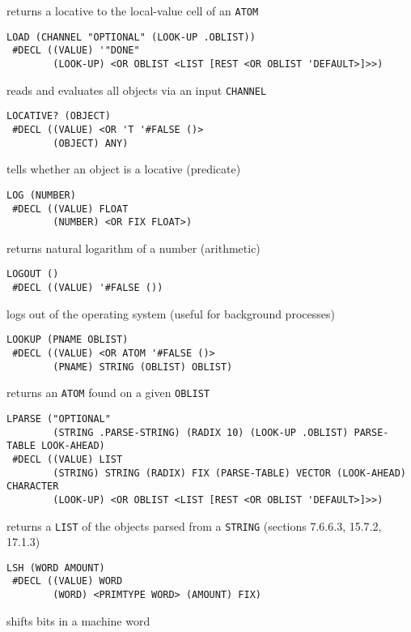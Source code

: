 \documentclass[a4paper]{scrbook}
\begin{document}
returns a locative to the local-value cell of an \texttt{ATOM}

\begin{verbatim}
LOAD (CHANNEL "OPTIONAL" (LOOK-UP .OBLIST))
 #DECL ((VALUE) '"DONE"
        (LOOK-UP) <OR OBLIST <LIST [REST <OR OBLIST 'DEFAULT>]>>)
\end{verbatim}

reads and evaluates all objects via an input \texttt{CHANNEL}

\begin{verbatim}
LOCATIVE? (OBJECT)
 #DECL ((VALUE) <OR 'T '#FALSE ()>
        (OBJECT) ANY)
\end{verbatim}

tells whether an object is a locative (predicate)

\begin{verbatim}
LOG (NUMBER)
 #DECL ((VALUE) FLOAT
        (NUMBER) <OR FIX FLOAT>)
\end{verbatim}

returns natural logarithm of a number (arithmetic)

\begin{verbatim}
LOGOUT ()
 #DECL ((VALUE) '#FALSE ())
\end{verbatim}

logs out of the operating system (useful for background processes)

\begin{verbatim}
LOOKUP (PNAME OBLIST)
 #DECL ((VALUE) <OR ATOM '#FALSE ()>
        (PNAME) STRING (OBLIST) OBLIST)
\end{verbatim}

returns an \texttt{ATOM} found on a given \texttt{OBLIST}

\begin{verbatim}
LPARSE ("OPTIONAL"
        (STRING .PARSE-STRING) (RADIX 10) (LOOK-UP .OBLIST) PARSE-TABLE LOOK-AHEAD)
 #DECL ((VALUE) LIST
        (STRING) STRING (RADIX) FIX (PARSE-TABLE) VECTOR (LOOK-AHEAD) CHARACTER
        (LOOK-UP) <OR OBLIST <LIST [REST <OR OBLIST 'DEFAULT>]>>)
\end{verbatim}

returns a \texttt{LIST} of the objects parsed from a \texttt{STRING} (sections 7.6.6.3, 15.7.2, 17.1.3)

\begin{verbatim}
LSH (WORD AMOUNT)
 #DECL ((VALUE) WORD
        (WORD) <PRIMTYPE WORD> (AMOUNT) FIX)
\end{verbatim}

shifts bits in a machine word
\end{document}

